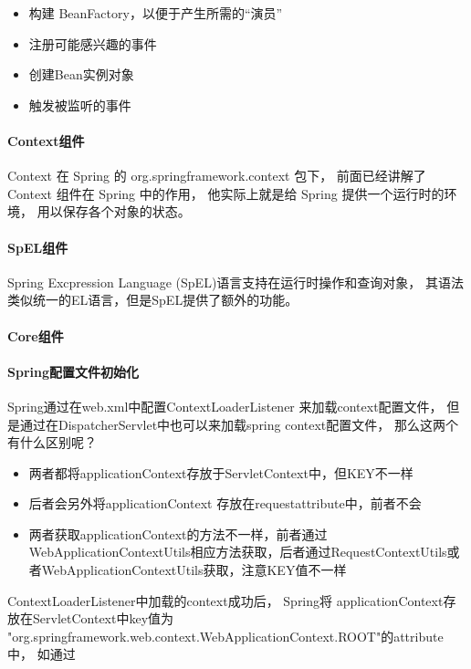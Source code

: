 \documentclass{book}
\begin{document}
\begin{itemize}
	\item{构建 BeanFactory，以便于产生所需的“演员”}
	\item{注册可能感兴趣的事件}
	\item{创建Bean实例对象}
	\item{触发被监听的事件}
\end{itemize}

\paragraph{Context组件}

Context 在 Spring 的 org.springframework.context 包下，
前面已经讲解了 Context 组件在 Spring 中的作用，
他实际上就是给 Spring 提供一个运行时的环境，
用以保存各个对象的状态。

\paragraph{SpEL组件}

Spring Excpression Language (SpEL)语言支持在运行时操作和查询对象，
其语法类似统一的EL语言，但是SpEL提供了额外的功能。

\paragraph{Core组件}

\paragraph{Spring配置文件初始化}

Spring通过在web.xml中配置ContextLoaderListener 来加载context配置文件，
但是通过在DispatcherServlet中也可以来加载spring context配置文件，
那么这两个有什么区别呢？

\begin{itemize}
	\item{两者都将applicationContext存放于ServletContext中，但KEY不一样}
	\item{后者会另外将applicationContext 存放在requestattribute中，前者不会}
	\item{两者获取applicationContext的方法不一样，前者通过WebApplicationContextUtils相应方法获取，后者通过RequestContextUtils或者WebApplicationContextUtils获取，注意KEY值不一样}
\end{itemize}

ContextLoaderListener中加载的context成功后，
Spring将 applicationContext存放在ServletContext中key值为
"org.springframework.web.context.WebApplicationContext.ROOT"的attribute中，
如通过
\end{document}
